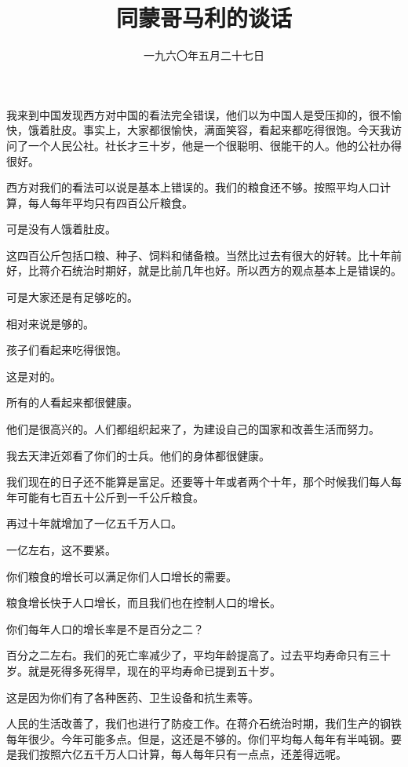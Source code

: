 
\title{同蒙哥马利的谈话}
\date{一九六〇年五月二十七日}
\maketitle


我来到中国发现西方对中国的看法完全错误，他们以为中国人是受压抑的，很不愉快，饿着肚皮。事实上，大家都很愉快，满面笑容，看起来都吃得很饱。今天我访问了一个人民公社。社长才三十岁，他是一个很聪明、很能干的人。他的公社办得很好。

西方对我们的看法可以说是基本上错误的。我们的粮食还不够。按照平均人口计算，每人每年平均只有四百公斤粮食。

可是没有人饿着肚皮。

这四百公斤包括口粮、种子、饲料和储备粮。当然比过去有很大的好转。比十年前好，比蒋介石统治时期好，就是比前几年也好。所以西方的观点基本上是错误的。

可是大家还是有足够吃的。

相对来说是够的。

孩子们看起来吃得很饱。

这是对的。

所有的人看起来都很健康。

他们是很高兴的。人们都组织起来了，为建设自己的国家和改善生活而努力。

我去天津近郊看了你们的士兵。他们的身体都很健康。

我们现在的日子还不能算是富足。还要等十年或者两个十年，那个时候我们每人每年可能有七百五十公斤到一千公斤粮食。

再过十年就增加了一亿五千万人口。

一亿左右，这不要紧。

你们粮食的增长可以满足你们人口增长的需要。

粮食增长快于人口增长，而且我们也在控制人口的增长。

你们每年人口的增长率是不是百分之二？

百分之二左右。我们的死亡率减少了，平均年龄提高了。过去平均寿命只有三十岁。就是死得多死得早，现在的平均寿命已提到五十岁。

这是因为你们有了各种医药、卫生设备和抗生素等。

人民的生活改善了，我们也进行了防疫工作。在蒋介石统治时期，我们生产的钢铁每年很少。今年可能多点。但是，这还是不够的。你们平均每人每年有半吨钢。要是我们按照六亿五千万人口计算，每人每年只有一点点，还差得远呢。


